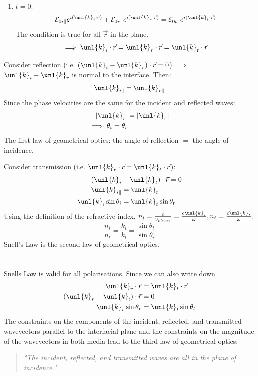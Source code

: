 \documentclass[a4paper, 11pt, normalem]{report}
\newcommand\E{\mathcal{E}}
\newcommand\vr{\vec{r}}
\newcommand\vk{\unl{k}}
\newcommand\om{\omega}
\begin{document}
\begin{enumerate}
	\item $t=0$:
	\begin{equation}
		\E_{0i\parallel}e^{i(\vk_i\cdot\vr)} + \E_{0r\parallel}e^{i(\vk_r\cdot\vr)} = \E_{0t\parallel}e^{i(\vk_t\cdot\vr)}
	\end{equation}
	The condition is true for all $\vr$ in the plane.
	\begin{equation}
		\implies \vk_i\cdot\vr = \vk_r\cdot\vr = \vk_t\cdot\vr
	\end{equation}
\end{enumerate}
Consider reflection (i.e. $(\vk_i - \vk_r)\cdot\vr = 0$) $\implies$ $\vk_i - \vk_r$ is normal to the interface. Then:
\begin{equation}
	\vk_{i\parallel} = \vk_{r\parallel}
\end{equation}
Since the phase velocities are the same for the incident and reflected waves:
\begin{align}
	|\vk_r| &= |\vk_r| \\
	\implies \theta_i = \theta_r
\end{align}
The first law of geometrical optics: the angle of reflection $=$ the angle of incidence.

Consider transmission (i.e. $\vk_r\cdot\vr = \vk_t\cdot\vr$):
\begin{align}
	(\vk_i &- \vk_t)\cdot\vr = 0 \\
	\vk_{i\parallel} &= \vk_{t\parallel} \\
	\vk_i\sin\theta_i &= \vk_t\sin\theta_t
\end{align}
Using the definition of the refractive index, $n_i = \frac{c}{v_{phase}} = \frac{c\vk_i}{\om}, n_t = \frac{c\vk_t}{\om}$:
\begin{equation}
	\frac{n_i}{n_t} = \frac{k_i}{k_t} = \frac{\sin\theta_t}{\sin\theta_i} \tag{Snell's Law}
\end{equation}
Snell's Law is the second law of geometrical optics.

\chapter{}
Snells Law is valid for all polarisations.
Since we can also write down
\begin{align}
	\vk_r\cdot \vr &= \vk_t\cdot \vr \\
	(\vk_r - \vk_t)\cdot\vr &= 0 \\
	\vk_r\sin\theta_r &= \vk_t\sin\theta_t
\end{align}
The constraints on the components of the incident, reflected, and transmitted wavevectors parallel to the interfacial plane and the constraints on the magnitude of the wavevectors in both media lead to the third law of geometrical optics:
\begin{quote}
\emph{"The incident, reflected, and transmitted waves are all in the plane of incidence."}
\end{quote}
\end{document}
